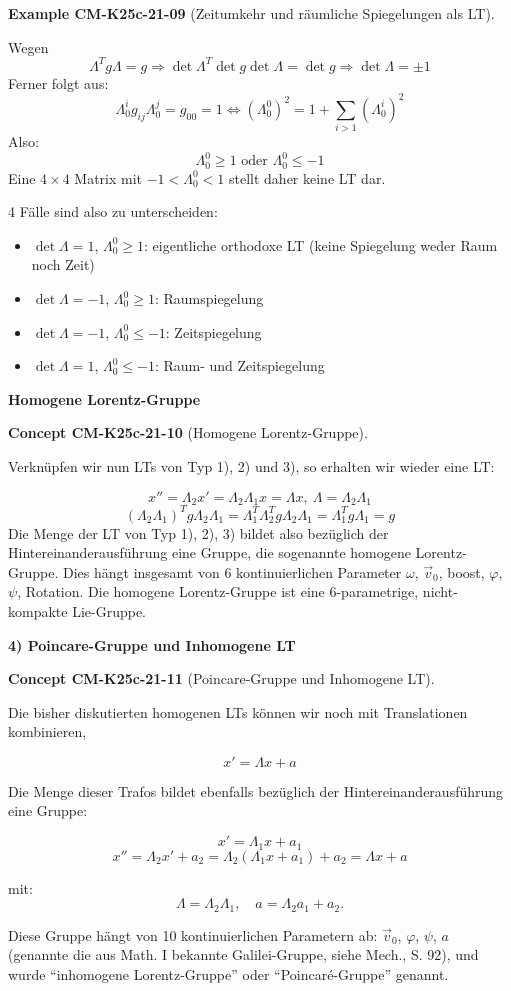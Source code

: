\documentclass[10pt, letterpaper]{article}
\newcommand{\CustomHeading}[3]{%
  \par\medskip\noindent%
  \textbf{#1 #2} \textnormal{(#3)}.\enskip%
}
\newenvironment{EXA}[2]{\begin{unitbox}\CustomHeading{Example}{#1}{#2}}{\end{unitbox}}
\newenvironment{CONC}[2]{\begin{unitbox}\CustomHeading{Concept}{#1}{#2}}{\end{unitbox}}
\begin{document}
\begin{EXA}{CM-K25c-21-09}{Zeitumkehr und räumliche Spiegelungen als LT}
Wegen 
$$\Lambda^T g \Lambda = g \Rightarrow \det\Lambda^T \det g \det \Lambda = \det g
\Rightarrow \det \Lambda = \pm 1$$
Ferner folgt aus:
$$\Lambda^i_0 g_{ij} \Lambda^j_0 = g_{00} = 1 \Leftrightarrow (\Lambda^0_0)^2 = 1+ \sum_{i>1} (\Lambda^i_0)^2$$
Also: 
$$\Lambda^0_0 \geq 1 \text{ oder } \Lambda^0_0 \leq -1$$
Eine $4\times4$ Matrix mit $-1 < \Lambda^0_0 < 1$ stellt daher keine LT dar.

4 Fälle sind also zu unterscheiden:
\begin{itemize}
\item $\det \Lambda = 1$, $\Lambda^0_0 \geq 1$: eigentliche orthodoxe LT (keine Spiegelung weder Raum noch Zeit)
\item $\det \Lambda = -1$, $\Lambda^0_0 \geq 1$: Raumspiegelung
\item $\det \Lambda = -1$, $\Lambda^0_0 \leq -1$: Zeitspiegelung
\item $\det \Lambda = 1$, $\Lambda^0_0 \leq -1$: Raum- und Zeitspiegelung
\end{itemize}
\end{EXA}



\textbf{Homogene Lorentz-Gruppe}

\begin{CONC}{CM-K25c-21-10}{Homogene Lorentz-Gruppe}
Verknüpfen wir nun LTs von Typ 1), 2) und 3), so erhalten wir wieder eine LT:

$$x'' = \Lambda_2 x' = \Lambda_2 \Lambda_1 x = \Lambda x,\ \Lambda = \Lambda_2 \Lambda_1$$
$$(\Lambda_2 \Lambda_1)^T g \Lambda_2 \Lambda_1 = \Lambda_1^T \Lambda_2^T g \Lambda_2 \Lambda_1 = \Lambda_1^T g \Lambda_1 = g$$
Die Menge der LT von Typ 1), 2), 3) bildet also bezüglich der Hintereinanderausführung eine Gruppe, die sogenannte homogene Lorentz-Gruppe. Dies hängt insgesamt von
6 kontinuierlichen Parameter $\omega$, $\vec{v}_0$, boost, $\varphi$, $\psi$, Rotation.
Die homogene Lorentz-Gruppe ist eine 6-parametrige, nicht-kompakte Lie-Gruppe.
\end{CONC}



\textbf{4) Poincare-Gruppe und Inhomogene LT}

\begin{CONC}{CM-K25c-21-11}{Poincare-Gruppe und Inhomogene LT}
Die bisher diskutierten homogenen LTs können wir noch mit Translationen kombinieren,

\[x' = \Lambda x + a\]

Die Menge dieser Trafos bildet ebenfalls bezüglich der Hintereinanderausführung eine Gruppe:

\[x' = \Lambda_1 x + a_1\]
\[x'' = \Lambda_2 x' + a_2 = \Lambda_2(\Lambda_1 x + a_1) + a_2 = \Lambda x + a\]

mit: \[\Lambda = \Lambda_2\Lambda_1, \quad a = \Lambda_2 a_1 + a_2.\]

Diese Gruppe hängt von 10 kontinuierlichen Parametern ab: $\vec{v}_0$, $\varphi$, $\psi$, $a$ (genannte die aus Math. I bekannte Galilei-Gruppe, siehe Mech., S. 92), und wurde ``inhomogene Lorentz-Gruppe'' oder ``Poincaré-Gruppe'' genannt.
\end{CONC}
\end{document}

